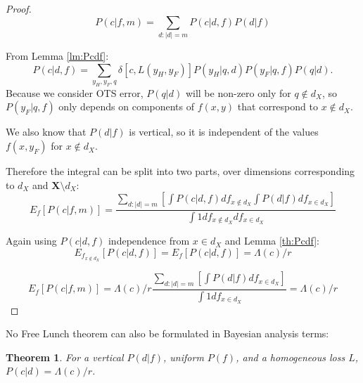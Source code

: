\documentclass[a4paper]{article}
\newtheorem{theorem}{Theorem}[section]
\begin{document}
\begin{proof}
  \begin{equation}
    P\left(c|f,m\right) = \sum_{d:|d|=m} P\left(c|d,f\right)P\left(d|f\right)
  \end{equation}

  From Lemma \ref{lm:Pcdf}:
  \begin{equation}
    P(c|d,f) = \sum_{y_H,y_F,q}\delta\left[c,L\left(y_H, y_F\right)\right] P\left(y_H|q, d\right)
    P\left(y_F| q, f\right)P\left(q|d\right).
  \end{equation}
  Because we consider OTS error, $P\left(q|d\right)$ will be non-zero
  only for $q \notin d_X$, so $P\left(y_F| q, f\right)$ only depends on
  components of $f(x,y)$ that correspond to $x\notin d_X$.
  
  We also know that $P\left(d|f\right)$ is vertical, so it is
  independent of the values $f(x,y_F)$ for $x \notin d_X$.
  
  Therefore the integral can be split into two parts, over dimensions
  corresponding to $d_X$ and $\mathbf{X} \setminus d_X$:
  \begin{equation}
    E_f \left[P\left(c|f,m\right)\right] = \frac{\sum_{d:|d|=m}
      \left[\int P\left(c|d,f \right) df_{x\notin d_X}
        \int P\left(d|f\right) df_{x \in d_X} \right]}{\int 1 df_{x\notin d_X} df_{x \in d_X}}
  \end{equation}
  
  Again using $P\left(c|d, f\right)$ independence from $x\in d_X$ and Lemma \ref{th:Pcdf}:
  \begin{equation}
    E_{f_{x\notin d_X}} \left[P\left(c|d, f\right)\right] = E_f \left[P\left(c|d, f\right)\right] = 
    \Lambda(c)/r
  \end{equation}
  
  \begin{equation}
    E_f \left[P\left(c|f,m\right)\right] = \Lambda(c)/r \frac{\sum_{d:|d|=m}
      \left[\int  P\left(d|f\right) df_{x \in d_X} \right]}{\int 1 df_{x \in d_X}} =
    \Lambda(c)/r
  \end{equation}
\end{proof}

No Free Lunch theorem can also be formulated in Bayesian analysis
terms:
\begin{theorem}
  For a vertical $P(d|f)$, uniform $P(f)$, and a homogeneous loss $L$,
  $P(c|d) = \Lambda(c)/r$.
  \label{Pcd}
\end{theorem}
\end{document}
